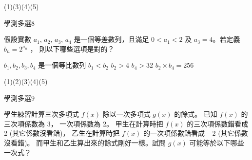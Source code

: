 \begin{QUESTIONS}
\begin{QUESTION}
        \begin{QFROMS}
        \end{QFROMS}
        \begin{QTAGS}\end{QTAGS}
        \begin{QANS}
            (1)(3)(4)(5)
        \end{QANS}
        \begin{QSOLLIST}
        \end{QSOLLIST}
        \begin{QEMPTYSPACE}
        \end{QEMPTYSPACE}
    \end{QUESTION}
    \begin{QUESTION}
        \begin{ExamInfo}{95}{學測}{多選}{8}
        \end{ExamInfo}
        \begin{ExamAnsRateInfo}{38}{71}{33}{10}
        \end{ExamAnsRateInfo}
        \begin{QBODY}
            假設實數 $a_1$, $a_2$, $a_3$, $a_4$ 是一個等差數列，且滿足 $0<a_1 <2$ 及 $a_3 =4$。若定義 $b_n =2^{a_n}$ ， 則以下哪些選項是對的？
		\begin{QOPS} 
			\QOP $b_1 ,b_2 ,b_3 ,b_4$ 是一個等比數列 
			\QOP $b_1 <b_{2}$     
			\QOP $b_2 >4$ 
			\QOP $b_4 > 32$
			\QOP $b_2 \times b_4 =256$
		\end{QOPS}
        \end{QBODY}
        \begin{QFROMS}
        \end{QFROMS}
        \begin{QTAGS}\end{QTAGS}
        \begin{QANS}
            (1)(2)(3)(4)(5)
        \end{QANS}
        \begin{QSOLLIST}
        \end{QSOLLIST}
        \begin{QEMPTYSPACE}
        \end{QEMPTYSPACE}
    \end{QUESTION}
    \begin{QUESTION}
        \begin{ExamInfo}{95}{學測}{多選}{9}
        \end{ExamInfo}
        \begin{ExamAnsRateInfo}{38}{71}{30}{13}
        \end{ExamAnsRateInfo}
        \begin{QBODY}
            學生練習計算三次多項式 $f (x)$ 除以一次多項式 $g(x)$ 的餘式。
			已知 $f (x)$ 的三次項係數為 3， 一次項係數為 2。
			甲生在計算時把 $f(x)$ 的三次項係數錯看成 2 (其它係數沒看錯)，
			乙生在計算時把 $f (x)$ 的一次項係數錯看成 $-2$ (其它係數沒看錯)。
			而甲生和乙生算出來的餘式剛好一樣。試問 $g(x)$ 可能等於以下哪些一次式？


\end{QBODY}
\end{QUESTION}
\end{QUESTIONS}

